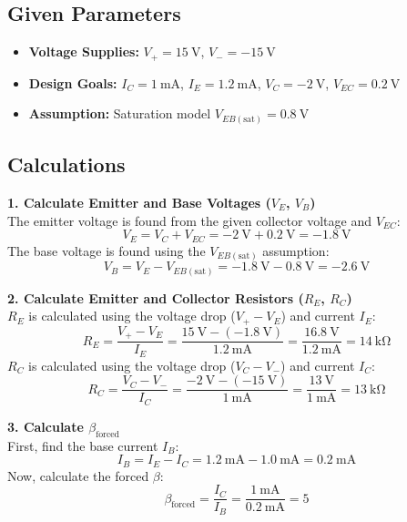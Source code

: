 \documentclass[11pt]{article}
\begin{document}
\subsection{Given Parameters}
\begin{itemize}
    \item \textbf{Voltage Supplies:} $V_{+} = \SI{15}{\volt}$, $V_{-} = \SI{-15}{\volt}$
    \item \textbf{Design Goals:} $I_{C} = \SI{1}{\milli\ampere}$, $I_{E} = \SI{1.2}{\milli\ampere}$, $V_{C} = \SI{-2}{\volt}$, $V_{EC} = \SI{0.2}{\volt}$
    \item \textbf{Assumption:} Saturation model $V_{EB(\text{sat})} = \SI{0.8}{\volt}$
\end{itemize}

\subsection{Calculations}
\textbf{1. Calculate Emitter and Base Voltages ($V_E$, $V_B$)} \\
The emitter voltage is found from the given collector voltage and $V_{EC}$:
$$
V_E = V_C + V_{EC} = \SI{-2}{\volt} + \SI{0.2}{\volt} = \SI{-1.8}{\volt}
$$
The base voltage is found using the $V_{EB(\text{sat})}$ assumption:
$$
V_B = V_E - V_{EB(\text{sat})} = \SI{-1.8}{\volt} - \SI{0.8}{\volt} = \SI{-2.6}{\volt}
$$

\textbf{2. Calculate Emitter and Collector Resistors ($R_E$, $R_C$)} \\
$R_E$ is calculated using the voltage drop ($V_+ - V_E$) and current $I_E$:
$$
R_E = \frac{V_{+} - V_E}{I_E} = \frac{\SI{15}{\volt} - (\SI{-1.8}{\volt})}{\SI{1.2}{\milli\ampere}} = \frac{\SI{16.8}{\volt}}{\SI{1.2}{\milli\ampere}} = \SI{14}{\kilo\ohm}
$$
$R_C$ is calculated using the voltage drop ($V_C - V_-$) and current $I_C$:
$$
R_C = \frac{V_C - V_{-}}{I_C} = \frac{\SI{-2}{\volt} - (\SI{-15}{\volt})}{\SI{1}{\milli\ampere}} = \frac{\SI{13}{\volt}}{\SI{1}{\milli\ampere}} = \SI{13}{\kilo\ohm}
$$

\textbf{3. Calculate $\beta_{\text{forced}}$} \\
First, find the base current $I_B$:
$$
I_B = I_E - I_C = \SI{1.2}{\milli\ampere} - \SI{1.0}{\milli\ampere} = \SI{0.2}{\milli\ampere}
$$
Now, calculate the forced $\beta$:
$$
\beta_{\text{forced}} = \frac{I_C}{I_B} = \frac{\SI{1}{\milli\ampere}}{\SI{0.2}{\milli\ampere}} = 5
$$
\end{document}
